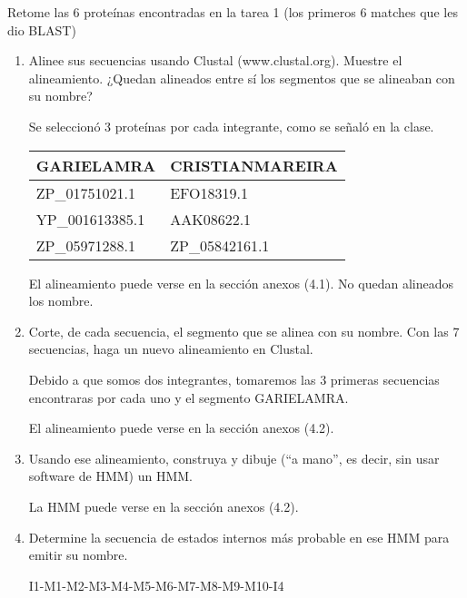 Retome las 6 proteínas encontradas en la tarea 1 (los primeros 6 matches que les dio BLAST)

\begin{enumerate}
	\item Alinee sus secuencias usando Clustal (www.clustal.org). Muestre el alineamiento. ¿Quedan
		alineados entre sí los segmentos que se alineaban con su nombre?
	

		Se seleccionó 3 proteínas por cada integrante, como se señaló en la clase.

		\begin{tabular}{|l|l|}
			\hline
			GARIELAMRA & CRISTIANMAREIRA \\
			\hline
			ZP\_01751021.1 & EFO18319.1 \\ 
			YP\_001613385.1 & AAK08622.1 \\
			ZP\_05971288.1 & ZP\_05842161.1 \\
			\hline
		\end{tabular}

	El alineamiento puede verse en la sección anexos (4.1).	No quedan alineados los nombre.
			

	\item Corte, de cada secuencia, el segmento que se alinea con su nombre. Con las 7 secuencias,
		haga un nuevo alineamiento en Clustal.


		Debido a que somos dos integrantes, tomaremos las 3 primeras secuencias encontraras por cada uno y el segmento GARIELAMRA.

	El alineamiento puede verse en la sección anexos (4.2).

	\item Usando ese alineamiento, construya y dibuje (“a mano”, es decir, sin usar software de HMM)
		un HMM.


	La HMM puede verse en la sección anexos (4.2).

	\item Determine la secuencia de estados internos más probable en ese HMM para emitir su
		nombre.


		I1-M1-M2-M3-M4-M5-M6-M7-M8-M9-M10-I4

\end{enumerate}
